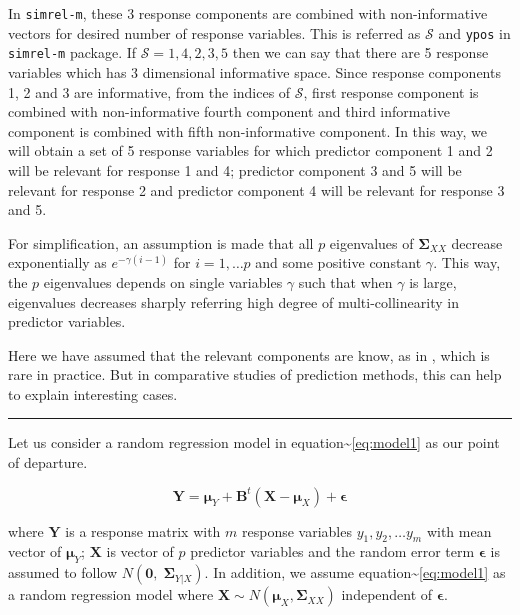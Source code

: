 \documentclass[12pt,A4paper,authoryear]{elsarticle} %
\begin{document}
In \texttt{simrel-m}, these 3 response components are combined with
non-informative vectors for desired number of response variables. This
is referred as \(\mathcal{S}\) and \texttt{ypos} in \texttt{simrel-m}
package. If \(\mathcal{S} = {{1, 4}, {2}, {3, 5}}\) then we can say that
there are 5 response variables which has 3 dimensional informative
space. Since response components 1, 2 and 3 are informative, from the
indices of \(\mathcal{S}\), first response component is combined with
non-informative fourth component and third informative component is
combined with fifth non-informative component. In this way, we will
obtain a set of 5 response variables for which predictor component 1 and
2 will be relevant for response 1 and 4; predictor component 3 and 5
will be relevant for response 2 and predictor component 4 will be
relevant for response 3 and 5.

For simplification, an assumption is made that all \(p\) eigenvalues of
\(\boldsymbol{\Sigma}_{XX}\) decrease exponentially as
\(e^{-\gamma (i - 1)}\) for \(i = 1, \ldots p\) and some positive
constant \(\gamma\). This way, the \(p\) eigenvalues depends on single
variables \(\gamma\) such that when \(\gamma\) is large, eigenvalues
decreases sharply referring high degree of multi-collinearity in
predictor variables.

Here we have assumed that the relevant components are know, as in
\citet{helland1994comparison}, which is rare in practice. But in
comparative studies of prediction methods, this can help to explain
interesting cases.

\begin{center}\rule{0.5\linewidth}{\linethickness}\end{center}

Let us consider a random regression model in
equation\textasciitilde{}\eqref{eq:model1} as our point of departure.

\begin{equation}
  \mathbf{Y} = \boldsymbol{\mu}_Y + \mathbf{B}^t (\mathbf{X} - \boldsymbol{\mu}_X) + \boldsymbol{\epsilon}
  \label{eq:model1}
\end{equation}

where \(\mathbf{Y}\) is a response matrix with \(m\) response variables
\(y_1, y_2, \ldots y_m\) with mean vector of \(\boldsymbol{\mu}_Y\);
\(\mathbf{X}\) is vector of \(p\) predictor variables and the random
error term \(\boldsymbol{\epsilon}\) is assumed to follow
\(N(\boldsymbol{0},\; \boldsymbol{\Sigma}_{Y|X})\). In addition, we
assume equation\textasciitilde{}\eqref{eq:model1} as a random regression
model where
\(\mathbf{X} \sim N\left(\boldsymbol{\mu}_X, \boldsymbol{\Sigma}_{XX}\right)\)
independent of \(\boldsymbol{\epsilon}\).
\end{document}
